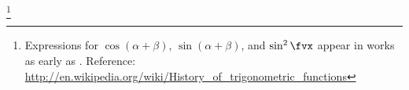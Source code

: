 \begin{theorem}
\footnote{Expressions for $\cos(\alpha+\beta)$, $\sin(\alpha+\beta)$, and $\sin^2\fvx$
  appear in works as early as .
  Reference: \url{http://en.wikipedia.org/wiki/History_of_trigonometric_functions}
  }
\label{thm:trig_a+b}
\label{thm:trig_double}
\end{theorem}
